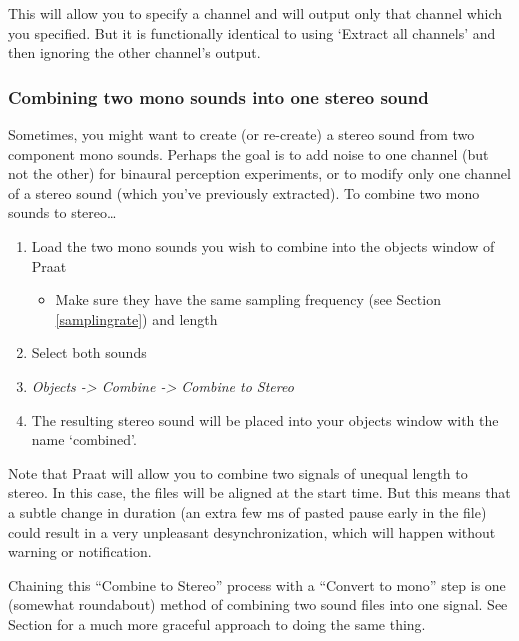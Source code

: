 \documentclass[11pt]{article}
\def\tightlist{}
\begin{document}
This will allow you to specify a channel and will output only that
channel which you specified. But it is functionally identical to using
`Extract all channels' and then ignoring the other channel's output.

\hypertarget{combining-two-mono-sounds-into-one-stereo-sound}{%
\subsubsection{Combining two mono sounds into one stereo
sound}\label{combining-two-mono-sounds-into-one-stereo-sound}}

Sometimes, you might want to create (or re-create) a stereo sound from
two component mono sounds. Perhaps the goal is to add noise to one
channel (but not the other) for binaural perception experiments, or to
modify only one channel of a stereo sound (which you've previously
extracted). To combine two mono sounds to stereo\ldots{}

\begin{enumerate}
\def\labelenumi{\arabic{enumi}.}
\tightlist
\item
  Load the two mono sounds you wish to combine into the objects window
  of Praat

  \begin{itemize}
  \tightlist
  \item
    Make sure they have the same sampling frequency (see Section
    \ref{samplingrate}) and length
  \end{itemize}
\item
  Select both sounds
\item
  \emph{Objects -\textgreater{} Combine -\textgreater{} Combine to
  Stereo}
\item
  The resulting stereo sound will be placed into your objects window
  with the name `combined'.
\end{enumerate}

Note that Praat will allow you to combine two signals of unequal length
to stereo. In this case, the files will be aligned at the start time.
But this means that a subtle change in duration (an extra few ms of
pasted pause early in the file) could result in a very unpleasant
desynchronization, which will happen without warning or notification.

Chaining this ``Combine to Stereo'' process with a ``Convert to mono''
step is one (somewhat roundabout) method of combining two sound files
into one signal. See Section \label{sub:formulas} for a much more
graceful approach to doing the same thing.
\end{document}
